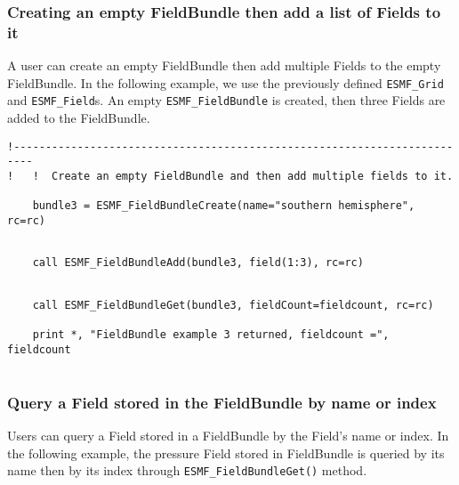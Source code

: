    \subsubsection{Creating an empty FieldBundle then add a list of Fields to it}
   \label{sec:fieldbundle:usage:create_emptylist}
   A user can create an empty FieldBundle then add multiple 
   Fields to the empty FieldBundle.
   In the following example, we use the previously defined {\tt ESMF\_Grid}
   and {\tt ESMF\_Field}s.
   An empty {\tt ESMF\_FieldBundle} is created, then three Fields are added
   to the FieldBundle. 

 \begin{verbatim}
!-------------------------------------------------------------------------
!   !  Create an empty FieldBundle and then add multiple fields to it.

    bundle3 = ESMF_FieldBundleCreate(name="southern hemisphere", rc=rc)
 
\end{verbatim}
 

 \begin{verbatim}
    call ESMF_FieldBundleAdd(bundle3, field(1:3), rc=rc)
 
\end{verbatim}
 

 \begin{verbatim}
    call ESMF_FieldBundleGet(bundle3, fieldCount=fieldcount, rc=rc)

    print *, "FieldBundle example 3 returned, fieldcount =", fieldcount
 
\end{verbatim}
 

   \subsubsection{Query a Field stored in the FieldBundle by name or index}
   \label{sec:fieldbundle:usage:get}
   Users can query a Field stored in a FieldBundle by the Field's name or index.
   In the following example, the pressure Field stored in FieldBundle
   is queried by its name then by its index through {\tt ESMF\_FieldBundleGet()}
   method. 

